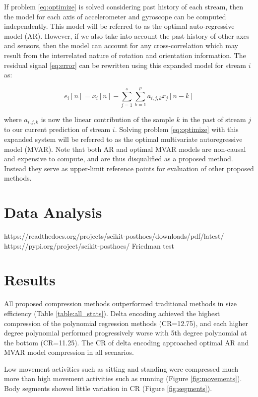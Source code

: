 \documentclass[journal]{IEEEtran}
\begin{document}
If problem \eqref{eq:optimize} is solved considering past history of each stream, then the model for each axis of accelerometer and gyroscope can be computed independently. This model will be referred to as the optimal auto-regressive model (AR). However, if we also take into account the past history of other axes and sensors, then the model can account for any cross-correlation which may result from the interrelated nature of rotation and orientation information. The residual signal \eqref{eq:error} can be rewritten using this expanded model for stream $i$ as:

\begin{equation*}
e_i[n] = x_i[n] - \sum_{j=1}^{s}\sum_{k=1}^{p}a_{i,j,k}x_j[n-k]
\end{equation*}

where $a_{i,j,k}$ is now the linear contribution of the sample $k$ in the past of stream $j$ to our current prediction of stream $i$. Solving problem \eqref{eq:optimize} with this expanded system will be referred to as the optimal multivariate autoregressive model (MVAR). Note that both AR and optimal MVAR models are non-causal and expensive to compute, and are thus disqualified as a proposed method. Instead they serve as upper-limit reference points for evaluation of other proposed methods.

\section{Data Analysis}
https://readthedocs.org/projects/scikit-posthocs/downloads/pdf/latest/
https://pypi.org/project/scikit-posthocs/
Friedman test
\section{Results}

All proposed compression methods outperformed traditional methods in size efficiency (Table \ref{table:all_stats}). Delta encoding achieved the highest compression of the polynomial regression methods (CR=12.75), and each higher degree polynomial performed progressively worse with 5th degree polynomial at the bottom (CR=11.25). The CR of delta encoding approached optimal AR and MVAR model compression in all scenarios.

Low movement activities such as sitting and standing were compressed much more than high movement activities such as running (Figure \ref{fig:movements}). Body segments showed little variation in CR (Figure \ref{fig:segments}).
\end{document}

